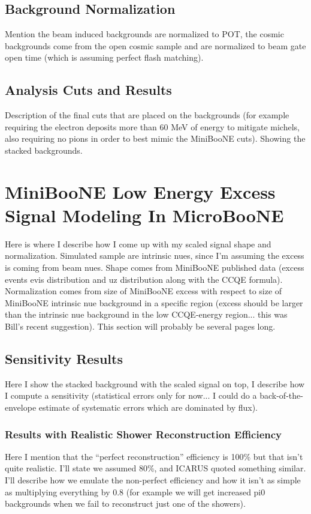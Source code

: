 \subsection{Background Normalization}
Mention the beam induced backgrounds are normalized to POT, the cosmic backgrounds come from the open cosmic sample and are normalized to beam gate open time (which is assuming perfect flash matching).

\subsection{Analysis Cuts and Results}
Description of the final cuts that are placed on the backgrounds (for example requiring the electron deposits more than 60 MeV of energy to mitigate michels, also requiring no pions in order to best mimic the MiniBooNE cuts). Showing the stacked backgrounds.



\section{MiniBooNE Low Energy Excess Signal Modeling In MicroBooNE}
Here is where I describe how I come up with my scaled signal shape and normalization. Simulated sample are intrinsic nues, since I'm assuming the excess is coming from beam nues. Shape comes from MiniBooNE published data (excess events evis distribution and uz distribution along with the CCQE formula). Normalization comes from size of MiniBooNE excess with respect to size of MiniBooNE intrinsic nue background in a specific region (excess should be larger than the intrinsic nue background in the low CCQE-energy region... this was Bill's recent suggestion). This section will probably be several pages long.

\subsection{Sensitivity Results}
Here I show the stacked background with the scaled signal on top, I describe how I compute a sensitivity (statistical errors only for now... I could do a back-of-the-envelope estimate of systematic errors which are dominated by flux). 
\subsubsection{Results with Realistic Shower Reconstruction Efficiency}
Here I mention that the ``perfect reconstruction'' efficiency is 100\% but that isn't quite realistic. I'll state we assumed 80\%, and ICARUS quoted something similar. I'll describe how we emulate the non-perfect efficiency and how it isn't as simple as multiplying everything by 0.8 (for example we will get increased pi0 backgrounds when we fail to reconstruct just one of the showers).
